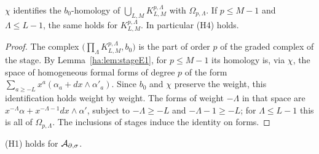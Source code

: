 \begin{lemma}\label{su:lem:H4}
\(\chi\) identifies the \(b_0\)-homology of
\(\bigcup_{L,M}K^{p,\Lambda}_{L,M}\) with \(\Omega_{p,\Lambda}\). If \(p\le
M-1\) and \(\Lambda\le L-1\), the same holds for
\(K^{p,\Lambda}_{L,M}\). In particular (H4) holds.
\end{lemma}

\begin{proof}
The complex \(\bigl(\prod_\Lambda K^{p,\Lambda}_{L,M},b_0\bigr)\) is the
part of order \(p\) of the graded complex of the stage. By
Lemma~\ref{ha:lem:stageE1}, for \(p\le M-1\) its homology is, via
\(\chi\), the space of homogeneous formal forms of degree \(p\) of the
form \(\sum_{a\ge-L}x^a(\alpha_a+dx\wedge\alpha'_a)\). Since \(b_0\) and
\(\chi\) preserve the weight, this identification holds weight by weight.
The forms of weight \(-\Lambda\) in that space are
\(x^{-\Lambda}\alpha+x^{-\Lambda-1}dx\wedge\alpha'\), subject to
\(-\Lambda\ge-L\) and \(-\Lambda-1\ge-L\); for \(\Lambda\le L-1\) this is
all of \(\Omega_{p,\Lambda}\). The inclusions of stages induce the
identity on forms.
\end{proof}

\begin{lemma}
\label{su:lem:H1}
(H1) holds for \(\mathcal A_{\partial,\sigma}\).
\end{lemma}

